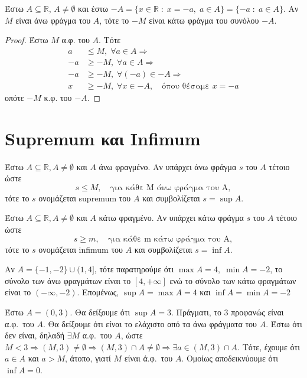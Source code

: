 \documentclass[main.tex]{subfiles}
\begin{document}
\begin{mypropbox}
  Έστω $ A \subseteq \mathbb{R}$, $A \neq \emptyset $ και έστω 
  $ -A = \{ x \in \mathbb{R} \; : \; x = -a, \; a \in A \} = \{ 
  -a \; : \; a \in A\} $. Αν $M$ είναι άνω φράγμα 
  του $A$, τότε το $ -M $ είναι κάτω φράγμα του συνόλου $ -A $.
\end{mypropbox}

\begin{proof}
  Έστω $M$ α.φ. του $A$. Τότε 
  \begin{align*}
    a &\leq M, \; \forall a \in A \Rightarrow  \\
    -a &\geq -M, \; \forall a \in A \Rightarrow \\
    -a &\geq -M, \; \forall (-a) \in -A \Rightarrow \\
    x &\geq -M, \; \forall x \in -A, \quad \text{όπου θέσαμε } x=-a 
  \end{align*}
  οπότε $ -M $  κ.φ. του $ -A $.
\end{proof}

\section{Supremum και Infimum}

\begin{mydfnbox}
  Έστω $ A \subseteq \mathbb{R}, A \neq \emptyset $ και $A$ άνω 
  φραγμένο. Αν υπάρχει άνω φράγμα $s$ του $A$ τέτοιο ώστε 
  \[
    s \leq M, \quad \text{για κάθε M άνω φράγμα του A}, 
  \] 
  τότε το $s$ ονομάζεται supremum του $A$ και συμβολίζεται $ s=\sup A $.
\end{mydfnbox}

\begin{mydfnbox}
  Έστω $ A \subseteq \mathbb{R}, A \neq \emptyset $ και $A$ κάτω 
  φραγμένο. Αν υπάρχει κάτω φράγμα $s$ του $A$ τέτοιο ώστε 
  \[
    s \geq m, \quad \text{για κάθε m κάτω φράγμα του A}, 
  \] 
  τότε το $s$ ονομάζεται infimum του $A$ και συμβολίζεται $ s=\inf A $.
\end{mydfnbox}

\begin{example}
  Αν $ A= \{ -1,-2 \} \cup (1,4] $, τότε παρατηρούμε ότι $ \max A = 4, \; \min A =-2 $,
  το σύνολο των άνω φραγμάτων είναι το $ [4,+\infty] $ ενώ το σύνολο των κάτω φραγμάτων
  είναι το $ (-\infty,-2) $. Επομένως, $ \sup A= \max A=4 $ και 
  $ \inf A = \min A= -2 $
\end{example}

\begin{example}
  Έστω $ A = (0,3) $. Θα δείξουμε ότι $ \sup A = 3 $. Πράγματι, 
  το $ 3 $ προφανώς είναι α.φ.\ του $A$. Θα δείξουμε ότι είναι το
  ελάχιστο από τα άνω φράγματα του $A$. Έστω ότι δεν είναι, δηλαδή 
  $ \exists M $ α.φ.\ του $A$, ώστε $ M < 3 \Rightarrow (M,3) \neq 
  \emptyset \Rightarrow (M,3) \cap A \neq \emptyset \Rightarrow \exists 
  a \in (M,3) \cap A $. Τότε, έχουμε ότι $ a \in A $ και $ a > M $, 
  άτοπο, γιατί $M$ είναι ά.φ.\ του $A$. Ομοίως αποδεικνύουμε ότι $ 
  \inf A = 0$.
\end{example}
\end{document}
